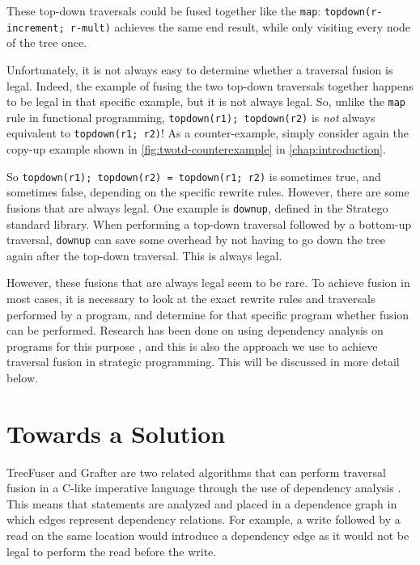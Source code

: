 These top-down traversals could be fused together like the \texttt{map}: \texttt{topdown(r-increment; r-mult)} achieves the same end result, while only visiting every node of the tree once.


Unfortunately, it is not always easy to determine whether a traversal fusion is legal. Indeed, the example of fusing the two top-down traversals together happens to be legal in that specific example, but it is not always legal. So, unlike the \texttt{map} rule in functional programming, \texttt{topdown(r1); topdown(r2)} is \textit{not} always equivalent to \texttt{topdown(r1; r2)}! As a counter-example, simply consider again the copy-up example shown in \autoref{fig:twotd-counterexample} in \autoref{chap:introduction}.

So \texttt{topdown(r1); topdown(r2) = topdown(r1; r2)} is sometimes true, and sometimes false, depending on the specific rewrite rules. However, there are some fusions that are always legal. One example is \texttt{downup}, defined in the Stratego standard library. When performing a top-down traversal followed by a bottom-up traversal, \texttt{downup} can save some overhead by not having to go down the tree again after the top-down traversal. This is always legal.

However, these fusions that are always legal seem to be rare. To achieve fusion in most cases, it is necessary to look at the exact rewrite rules and traversals performed by a program, and determine for that specific program whether fusion can be performed. Research has been done on using dependency analysis on programs for this purpose \cite{SakkaS017, SakkaSN019}, and this is also the approach we use to achieve traversal fusion in strategic programming. This will be discussed in more detail below.

\section{Towards a Solution}
\label{sec:towards-a-solution}
TreeFuser and Grafter are two related algorithms that can perform traversal fusion in a C-like imperative language through the use of dependency analysis \autocite{SakkaS017, SakkaSN019}. This means that statements are analyzed and placed in a dependence graph in which edges represent dependency relations. For example, a write followed by a read on the same location would introduce a dependency edge as it would not be legal to perform the read before the write.


